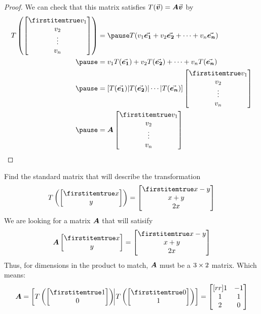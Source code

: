 \documentclass{beamer}
\begin{document}
\begin{frame}
\begin{proof}
We can check that this matrix satisfies $T({\vec{\boldsymbol{v}}})=\boldsymbol{A}{\vec{\boldsymbol{v}}}$ by
\begin{equation*}
\begin{aligned}
T\left(\bvector{v_1,v_2,\vdots,v_n}\right)&=\pause
T(v_1 \vect{e_1} + v_2 \vect{e_2} + \cdots + v_n \vect{e_n})\\\pause
&= v_1 T(\vect{e_1}) + v_2 T(\vect{e_2}) + \cdots + v_n T(\vect{e_n})\\\pause
&= \left[T(\vect{e_1})|T(\vect{e_2})|\cdots|T(\vect{e_n})\right]\bvector{v_1,v_2,\vdots,v_n}\\\pause
&=\mat{A}\bvector{v_1,v_2,\vdots,v_n}
\end{aligned}
\end{equation*}
\end{proof}
\end{frame}

\begin{frame}
\begin{example}
Find the standard matrix that will describe the transformation
\begin{equation*}
T\left(\bvector{x,y}\right)=\bvector{x-y, x+y, 2x}
\end{equation*}\pause
We are looking for a matrix $\boldsymbol{A}$ that will satisify
\begin{equation*}
\mat{A}\bvector{x,y}=\bvector{x-y, x+y, 2x}
\end{equation*}\pause
Thus, for dimensions in the product to match, $\boldsymbol{A}$ must be a $3\times 2$ matrix. Which means:
\begin{equation*}
\mat{A} = \left[ T\left(\bvector{1,0}\right)\vrule T\left(\bvector{0,1}\right)\right]=
\begin{bmatrix}[rr]
1 & -1 \\
1 &  1 \\
2 &  0 \\
\end{bmatrix}
\end{equation*}
\end{example}
\end{frame}
\end{document}
